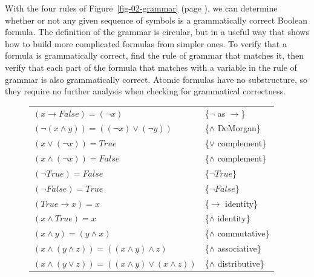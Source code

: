 With the four rules of
Figure~\ref{fig-02-grammar} (page \pageref{fig-02-grammar}),
we can determine whether or not any given sequence of symbols
is a grammatically correct Boolean formula.
The definition of the grammar is circular,
but in a useful way that shows
how to build more complicated formulas from simpler ones.
To verify that a formula is grammatically correct,
find the rule of grammar that matches it,
then verify that each part of the formula
that matches with a variable in the rule of grammar
is also grammatically correct.
Atomic formulas have no substructure,
so they require no further analysis when checking for grammatical correctness.

\begin{figure}
\begin{center}
\begin{tabular}{ll}
$(x \rightarrow False) = (\neg x)$                                   & \{$\neg$ as $\rightarrow$\}\label{neg-as-imp} \\
$(\neg(x \wedge y)) = ((\neg x) \vee (\neg y))$                      & \{$\wedge$ DeMorgan\}      \label{and-DeMorgan} \\
$(x \vee (\neg x)) = True$                                           & \{$\vee$ complement\}      \label{or-complement} \\
$(x \wedge (\neg x)) = False$                                        & \{$\wedge$ complement\}    \label{and-complement} \\
$(\neg True) = False$                                                & \{$\neg True$\}            \label{not-True} \\
$(\neg False) = True$                                                & \{$\neg False$\}           \label{not-False} \\
$(True \rightarrow x) = x$                                           & \{$\rightarrow$ identity\} \label{imp-identity} \\
$(x \wedge True) = x$                                                & \{$\wedge$ identity\}      \label{and-identity} \\
$(x \wedge y) = (y \wedge x)$                                        & \{$\wedge$ commutative\}   \label{and-commutative} \\
$(x \wedge (y \wedge z)) = ((x \wedge y) \wedge z)$                  & \{$\wedge$ associative\}   \label{and-associative} \\
$(x \wedge (y \vee z)) = ((x \wedge y) \vee (x \wedge z))$           & \{$\wedge$ distributive\}  \label{and-distributive} \\

\end{tabular}
\end{center}
\end{figure}
